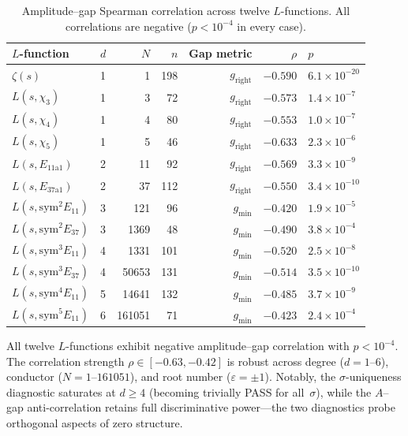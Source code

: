 \documentclass[11pt,a4paper]{article}
\theoremstyle{plain}
\theoremstyle{definition}
\begin{document}
\begin{table}[h]
\centering
\caption{Amplitude--gap Spearman correlation across twelve $L$-functions.
All correlations are negative ($p < 10^{-4}$ in every case).}
\label{tab:universality}
\begin{tabular}{llrrrrl}
\toprule
\textbf{$L$-function} & $d$ & $N$ & $n$ &
\textbf{Gap metric} & $\rho$ & $p$ \\
\midrule
$\zeta(s)$ & 1 & 1 & 198 & $g_{\mathrm{right}}$ & $-0.590$ & $6.1 \times 10^{-20}$ \\
$L(s,\chi_3)$ & 1 & 3 & 72 & $g_{\mathrm{right}}$ & $-0.573$ & $1.4 \times 10^{-7}$ \\
$L(s,\chi_4)$ & 1 & 4 & 80 & $g_{\mathrm{right}}$ & $-0.553$ & $1.0 \times 10^{-7}$ \\
$L(s,\chi_5)$ & 1 & 5 & 46 & $g_{\mathrm{right}}$ & $-0.633$ & $2.3 \times 10^{-6}$ \\
$L(s,E_{11\mathrm{a}1})$ & 2 & 11 & 92 & $g_{\mathrm{right}}$ & $-0.569$ & $3.3 \times 10^{-9}$ \\
$L(s,E_{37\mathrm{a}1})$ & 2 & 37 & 112 & $g_{\mathrm{right}}$ & $-0.550$ & $3.4 \times 10^{-10}$ \\
$L(s,\mathrm{sym}^2 E_{11})$ & 3 & 121 & 96 & $g_{\min}$ & $-0.420$ & $1.9 \times 10^{-5}$ \\
$L(s,\mathrm{sym}^2 E_{37})$ & 3 & 1369 & 48 & $g_{\min}$ & $-0.490$ & $3.8 \times 10^{-4}$ \\
$L(s,\mathrm{sym}^3 E_{11})$ & 4 & 1331 & 101 & $g_{\min}$ & $-0.520$ & $2.5 \times 10^{-8}$ \\
$L(s,\mathrm{sym}^3 E_{37})$ & 4 & 50653 & 131 & $g_{\min}$ & $-0.514$ & $3.5 \times 10^{-10}$ \\
$L(s,\mathrm{sym}^4 E_{11})$ & 5 & 14641 & 132 & $g_{\min}$ & $-0.485$ & $3.7 \times 10^{-9}$ \\
$L(s,\mathrm{sym}^5 E_{11})$ & 6 & 161051 & 71 & $g_{\min}$ & $-0.423$ & $2.4 \times 10^{-4}$ \\
\bottomrule
\end{tabular}
\end{table}

All twelve $L$-functions exhibit negative amplitude--gap correlation
with $p < 10^{-4}$.  The correlation strength $\rho \in [-0.63, -0.42]$
is robust across degree ($d = 1$--$6$), conductor ($N = 1$--$161051$),
and root number ($\varepsilon = \pm 1$).  Notably, the
$\sigma$-uniqueness diagnostic saturates at $d \ge 4$
(becoming trivially PASS for all~$\sigma$), while the $A$--gap
anti-correlation retains full discriminative power---the two
diagnostics probe orthogonal aspects of zero structure.
\end{document}
